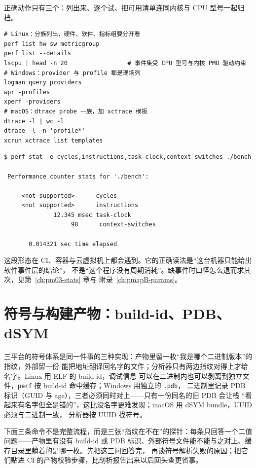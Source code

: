 \documentclass[12pt,a4paper,fontset=fandol]{ctexbook}
\newcommand{\Tp}[1]{\texttt{#1}}
\begin{document}
正确动作只有三个：列出来、逐个试、把可用清单连同内核与 CPU 型号一起归档。

\begin{lstlisting}[style=shellstyle, caption={三平台列出可用事件与模板的各自入口}, label={lst:pmapA-events}]
# Linux：分族列出，硬件、软件、指标组要分开看
perf list hw sw metricgroup
perf list --details
lscpu | head -n 20                 # 事件集受 CPU 型号与内核 PMU 驱动约束
# Windows：provider 与 profile 都是现场列
logman query providers
wpr -profiles
xperf -providers
# macOS：dtrace probe 一族，加 xctrace 模板
dtrace -l | wc -l
dtrace -l -n 'profile*'
xcrun xctrace list templates
\end{lstlisting}

\begin{lstlisting}[style=outstyle, caption={示意输出（格式示例，非本仓库实测值）：硬件事件不可用而软件事件可用时的典型形态}, label={lst:pmapA-out}]
$ perf stat -e cycles,instructions,task-clock,context-switches ./bench

 Performance counter stats for './bench':

     <not supported>      cycles
     <not supported>      instructions
              12.345 msec task-clock
                   98      context-switches

       0.014321 sec time elapsed
\end{lstlisting}

这段形态在 CI、容器与云虚拟机上都会遇到。它的正确读法是``这台机器只能给出软件事件层的结论''，
不是``这个程序没有周期消耗''。缺事件时口径怎么退而求其次，见第~\ref{ch:pm03-stats} 章与
附录~\ref{ch:pmapB-params}。

\section{符号与构建产物：build-id、PDB、dSYM}

三平台的符号体系是同一件事的三种实现：产物里留一枚``我是哪个二进制版本''的指纹，外部留一份
能把地址翻译回名字的文件；分析器只有两边指纹对得上才给名字。Linux 用 ELF 的 build-id，调试信息
可以在二进制内也可以剥离到独立文件，\Tp{perf} 按 build-id 命中缓存；Windows 用独立的 \Tp{.pdb}，
二进制里记录 PDB 标识（GUID 与 age），三者必须同时对上——只有一份同名的旧 PDB 会让栈
``看起来有名字但全是错的''，这比没名字更难发现；macOS 用 dSYM bundle，UUID 必须与二进制一致，
分析器按 UUID 找符号。

下面三条命令不是完整流程，而是三张``指纹在不在''的探针：每条只回答一个二值问题——产物里有没有
build-id 或 PDB 标识、外部符号文件能不能与之对上、缓存目录里躺着的是哪一枚。先把这三问回答完，
再谈符号解析失败的原因；把它们贴进 CI 的产物校验步骤，比剖析报告出来以后回头查更省事。
\end{document}
